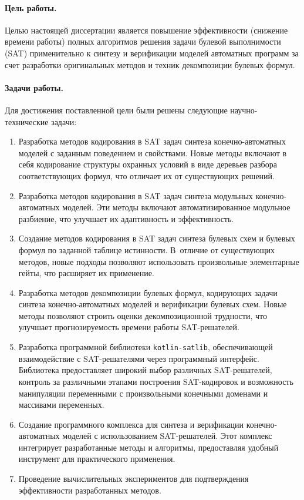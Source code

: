 
%
%
\paragraph{Цель работы.}
%
Целью настоящей диссертации является повышение эффективности (снижение времени работы) полных алгоритмов решения задачи булевой выполнимости (SAT) применительно к синтезу и верификации моделей автоматных программ за счет разработки оригинальных методов и техник декомпозиции булевых формул.


%
%
\paragraph{Задачи работы.}
%
Для достижения поставленной цели были решены следующие научно-технические задачи:
\begin{enumerate}[beginpenalty=10000]
    \item Разработка методов кодирования в SAT задач синтеза конечно-автоматных моделей с заданным поведением и свойствами. Новые методы включают в себя кодирование структуры охранных условий в виде деревьев разбора соответствующих формул, что отличает их от существующих решений.
    \item Разработка методов кодирования в SAT задач синтеза модульных конечно-автоматных моделей. Эти методы включают автоматизированное модульное разбиение, что улучшает их адаптивность и эффективность.
    \item Создание методов кодирования в SAT задач синтеза булевых схем и булевых формул по заданной таблице истинности. В~отличие от существующих методов, новые подходы позволяют использовать произвольные элементарные гейты, что расширяет их применение.
    \item Разработка методов декомпозиции булевых формул, кодирующих задачи синтеза конечно-автоматных моделей и верификации булевых схем. Новые методы позволяют строить оценки декомпозиционной трудности, что улучшает прогнозируемость времени работы SAT-решателей.
    \item Разработка программной библиотеки \texttt{kotlin-satlib}, обеспечивающей взаимодействие с SAT-решателями через программный интерфейс. Библиотека предоставляет широкий выбор различных SAT-решателей, контроль за различными этапами построения SAT-кодировок и возможность манипуляции переменными с произвольными конечными доменами и массивами переменных.
    \item Создание программного комплекса  для синтеза и верификации конечно-автоматных моделей с использованием SAT-решателей. Этот комплекс интегрирует разработанные методы и алгоритмы, предоставляя удобный инструмент для практического применения.
    \item Проведение вычислительных экспериментов для подтверждения эффективности разработанных методов.
\end{enumerate}


